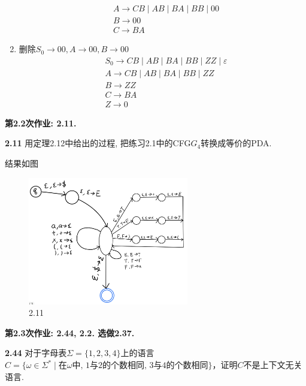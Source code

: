 \documentclass[UTF8]{report}
\newcommand{\problem}[1]{{\setlength{\parskip}{10pt}\noindent \bf{#1}}}
\newenvironment{solution}{{\noindent\hskip 2em \bf 解 \quad}}{}
\begin{document}
\begin{solution}
\begin{enumerate}
\begin{align*}
            &A \rightarrow CB \mid AB \mid BA \mid BB \mid 00\\
            &B \rightarrow 00\\
            &C \rightarrow BA
        \end{align*}
        \item 删除$S_0\rightarrow 00, A\rightarrow 00, B\rightarrow 00$
        \begin{align*}
            &S_0 \rightarrow CB \mid AB \mid BA \mid BB \mid ZZ \mid \varepsilon\\ 
            &A \rightarrow CB \mid AB \mid BA \mid BB \mid ZZ\\
            &B \rightarrow ZZ\\
            &C \rightarrow BA\\
            &Z \rightarrow 0
        \end{align*}
    \end{enumerate}
\end{solution}




\textbf{第2.2次作业: 2.11.}

\problem{2.11} 用定理2.12中给出的过程, 把练习2.1中的CFG$G_4$转换成等价的PDA.

\begin{solution}
    结果如图
    \begin{figure}[!htbp]
        \centering
        \includegraphics[width=7cm]{image/2.11.2.png}
        \caption{2.11}
        \label{fig:2_11}
    \end{figure}
\end{solution}






\textbf{第2.3次作业: 2.44, 2.2. 选做2.37.}

\problem{2.44} 对于字母表$\Sigma = \{1,2,3,4\}$上的语言$C=\{\omega\in \Sigma^* \mid \text{在}\omega\text{中, 1与2的个数相同, 3与4的个数相同}\}$，证明$C$不是上下文无关语言.
\end{document}
